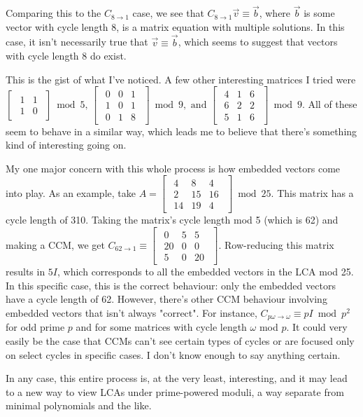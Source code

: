 \documentclass[a4paper, reqno, 12pt]{amsart}
\begin{document}
	Comparing this to the $C_{8 \rightarrow 1}$ case, we see that $C_{8 \rightarrow 1}\vec{v} \equiv \vec{b}$, where $\vec{b}$ is some vector with cycle length 8, is a
	matrix equation with multiple solutions. In this case, it isn't necessarily true that $\vec{v} \equiv \vec{b}$, which seems to suggest that vectors with cycle length
	8 do exist.
	
	This is the gist of what I've noticed. A few other interesting matrices I tried were $
	\begin{bmatrix}
		\begin{smallmatrix}
			1 & 1 \\
			1 & 0
		\end{smallmatrix}
	\end{bmatrix} \bmod{5}, \,
	\begin{bmatrix}
		\begin{smallmatrix}
			0 & 0 & 1 \\
			1 & 0 & 1 \\
			0 & 1 & 8
		\end{smallmatrix}
	\end{bmatrix} \bmod{9}, \text{ and }
	\begin{bmatrix}
		\begin{smallmatrix}
			4 & 1 & 6 \\
			6 & 2 & 2 \\
			5 & 1 & 6
		\end{smallmatrix}
	\end{bmatrix} \bmod{9}
	$. All of these seem to behave in a similar way, which leads me to believe that there's something kind of interesting going on. 
	
	My one major concern with this whole process is how embedded vectors come into play. As an example, take $A = 
	\begin{bmatrix}
		\begin{smallmatrix}
			4 & 8 & 4 \\
			2 & 15 & 16 \\
			14 & 19 & 4
		\end{smallmatrix}
	\end{bmatrix} \bmod{25}$. This matrix has a cycle length of 310. Taking the matrix's cycle length mod 5 (which is 62) and making a CCM, we get $C_{62 \rightarrow 1}
	\equiv 
	\begin{bmatrix}
		\begin{smallmatrix}
			0 & 5 & 5 \\
			20 & 0 & 0 \\
			5 & 0 & 20
		\end{smallmatrix}
	\end{bmatrix}$. Row-reducing this matrix results in $5I$, which corresponds to all the embedded vectors in the LCA mod 25. In this specific case, this is the correct 
	behaviour: only the embedded vectors have a cycle length of 62. However, there's other CCM behaviour involving embedded vectors that isn't always "correct". For instance,
	$C_{p\omega \rightarrow \omega} \equiv pI \bmod{p^2}$ for odd prime $p$ and for some matrices with cycle length $\omega$ mod $p$. It could very
	easily be the case that CCMs can't see certain types of cycles or are focused only on select cycles in specific cases. I don't know enough to say anything certain. 
	
	In any case, this entire process is, at the very least, interesting, and it may lead to a new way to view LCAs under prime-powered moduli, a way separate from minimal
	polynomials and the like.
\end{document}
